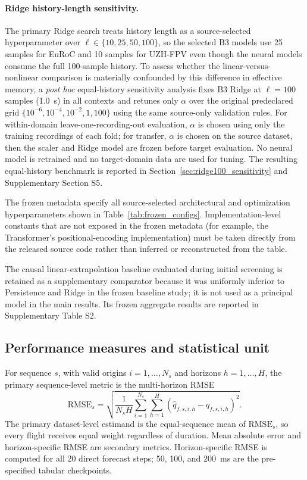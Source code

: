 \documentclass[preprint,12pt]{elsarticle}
\begin{document}
\paragraph{Ridge history-length sensitivity.}
The primary Ridge search treats history length as a source-selected hyperparameter over $\ell\in\{10,25,50,100\}$, so the selected B3 models use 25 samples for EuRoC and 10 samples for UZH-FPV even though the neural models consume the full 100-sample history. To assess whether the linear-versus-nonlinear comparison is materially confounded by this difference in effective memory, a \emph{post hoc} equal-history sensitivity analysis fixes B3 Ridge at $\ell=100$ samples (\SI{1.0}{\second}) in all contexts and retunes only $\alpha$ over the original predeclared grid $\{10^{-6},10^{-4},10^{-2},1,100\}$ using the same source-only validation rules. For within-domain leave-one-recording-out evaluation, $\alpha$ is chosen using only the training recordings of each fold; for transfer, $\alpha$ is chosen on the source dataset, then the scaler and Ridge model are frozen before target evaluation. No neural model is retrained and no target-domain data are used for tuning. The resulting equal-history benchmark is reported in Section~\ref{sec:ridge100_sensitivity} and Supplementary Section S5.

The frozen metadata specify all source-selected architectural and optimization hyperparameters shown in Table~\ref{tab:frozen_configs}. Implementation-level constants that are not exposed in the frozen metadata (for example, the Transformer's positional-encoding implementation) must be taken directly from the released source code rather than inferred or reconstructed from the table.

The causal linear-extrapolation baseline evaluated during initial screening is retained as a supplementary comparator because it was uniformly inferior to Persistence and Ridge in the frozen baseline study; it is not used as a principal model in the main results. Its frozen aggregate results are reported in Supplementary Table S2.

\subsection{Performance measures and statistical unit}

For sequence $s$, with valid origins $i=1,\ldots,N_s$ and horizons $h=1,\ldots,H$, the primary sequence-level metric is the multi-horizon RMSE
\begin{equation}
\mathrm{RMSE}_s=
\sqrt{
\frac{1}{N_sH}
\sum_{i=1}^{N_s}\sum_{h=1}^{H}
\left(\widehat{q}_{f,s,i,h}-q_{f,s,i,h}\right)^2
}.
\label{eq:seq_rmse}
\end{equation}
The primary dataset-level estimand is the equal-sequence mean of $\mathrm{RMSE}_s$, so every flight receives equal weight regardless of duration. Mean absolute error and horizon-specific RMSE are secondary metrics. Horizon-specific RMSE is computed for all 20 direct forecast steps; 50, 100, and \SI{200}{\milli\second} are the pre-specified tabular checkpoints.
\end{document}
